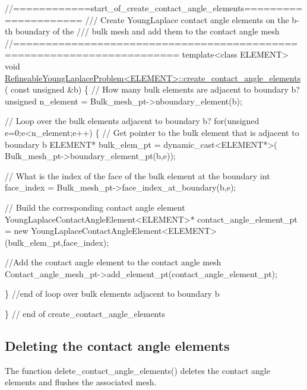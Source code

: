 \begin{DoxyCodeInclude}
\textcolor{comment}{//============start\_of\_create\_contact\_angle\_elements=====================}
\textcolor{comment}{/// Create YoungLaplace contact angle elements on the b-th boundary of the }
\textcolor{comment}{}\textcolor{comment}{/// bulk mesh and add them to the contact angle mesh}
\textcolor{comment}{}\textcolor{comment}{//=======================================================================}
\textcolor{keyword}{template}<\textcolor{keyword}{class} ELEMENT>
\textcolor{keywordtype}{void} \hyperlink{classRefineableYoungLaplaceProblem_a00d1304e030120e76d9f316dd4053116}{RefineableYoungLaplaceProblem<ELEMENT>::create\_contact\_angle\_elements}
      (
 \textcolor{keyword}{const} \textcolor{keywordtype}{unsigned} &b)
\{
 \textcolor{comment}{// How many bulk elements are adjacent to boundary b?}
 \textcolor{keywordtype}{unsigned} n\_element = Bulk\_mesh\_pt->nboundary\_element(b);

 \textcolor{comment}{// Loop over the bulk elements adjacent to boundary b?}
 \textcolor{keywordflow}{for}(\textcolor{keywordtype}{unsigned} e=0;e<n\_element;e++)
  \{
   \textcolor{comment}{// Get pointer to the bulk element that is adjacent to boundary b}
   ELEMENT* bulk\_elem\_pt = \textcolor{keyword}{dynamic\_cast<}ELEMENT*\textcolor{keyword}{>}(
    Bulk\_mesh\_pt->boundary\_element\_pt(b,e));

   \textcolor{comment}{// What is the index of the face of the bulk element at the boundary}
   \textcolor{keywordtype}{int} face\_index = Bulk\_mesh\_pt->face\_index\_at\_boundary(b,e);
   
   \textcolor{comment}{// Build the corresponding contact angle element}
   YoungLaplaceContactAngleElement<ELEMENT>* contact\_angle\_element\_pt = \textcolor{keyword}{new} 
   YoungLaplaceContactAngleElement<ELEMENT>(bulk\_elem\_pt,face\_index);

   \textcolor{comment}{//Add the contact angle element to the contact angle mesh}
   Contact\_angle\_mesh\_pt->add\_element\_pt(contact\_angle\_element\_pt);

  \} \textcolor{comment}{//end of loop over bulk elements adjacent to boundary b}

\} \textcolor{comment}{// end of create\_contact\_angle\_elements}

\end{DoxyCodeInclude}




 

\hypertarget{index_delete}{}\subsection{Deleting the contact angle elements}\label{index_delete}
The function {\ttfamily delete\+\_\+contact\+\_\+angle\+\_\+elements()} deletes the contact angle elements and flushes the associated mesh.


